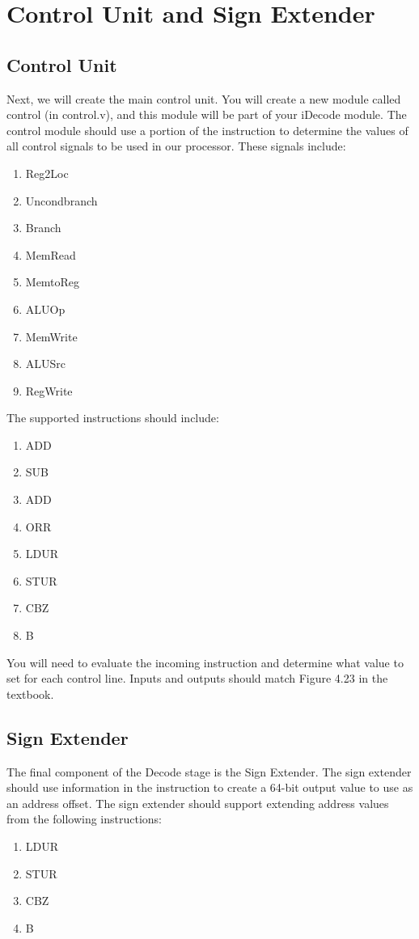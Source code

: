 \chapter{Control Unit and Sign Extender}

\section{Control Unit}
Next, we will create the main control unit.  You will create a new module called control (in control.v), and this module will be part of your iDecode module.  The control module should use a portion of the instruction to determine the values of all control signals to be used in our processor.  These signals include:
\begin{enumerate}
\item Reg2Loc
\item Uncondbranch
\item Branch
\item MemRead
\item MemtoReg
\item ALUOp
\item MemWrite
\item ALUSrc
\item RegWrite
\end{enumerate}

The supported instructions should include:
\begin{enumerate}
	\item ADD
	\item SUB
	\item ADD
	\item ORR
	\item LDUR
	\item STUR
	\item CBZ
	\item B
\end{enumerate}

You will need to evaluate the incoming instruction and determine what value to set for each control line.  Inputs and outputs should match Figure 4.23 in the textbook.

\section{Sign Extender}
The final component of the Decode stage is the Sign Extender.  The sign extender should use information in the instruction to create a 64-bit output value to use as an address offset.  The sign extender should support extending address values from the following instructions:
\begin{enumerate}
	\item LDUR
	\item STUR
	\item CBZ
	\item B
\end{enumerate}

